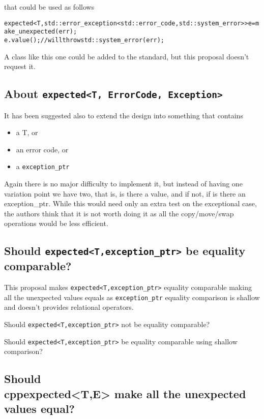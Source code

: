 \documentclass[a4paper,10pt]{article}
\newcommand{\cpp}[1]{\lstinline{#1}}
\begin{document}
\noindent
that could be used as follows

\begin{alltt}
expected<T, std::error_exception<std::error_code, std::system_error>> e = make_unexpected(err);
e.value(); // will throw std::system_error(err);
\end{alltt}

A class like this one could be added to the standard, but this proposal doesn't request it. 

\subsection{About \cpp{expected<T, ErrorCode, Exception>}}

It has been suggested also to extend the design into something that contains 

\begin{itemize}
\item a T, or
\item an error code, or
\item a \cpp{exception_ptr} 
\end{itemize}

Again there is no major difficulty to implement it, but instead of having one variation point we have two, that is, is there a value, and if not, if is there an exception_ptr. While this would need only an extra test on the exceptional case, the authors think that it is not worth doing it as all the copy/move/swap operations would be less efficient. 

\subsection{Should \cpp{expected<T,exception_ptr>} be equality comparable?}

This proposal makes \cpp{expected<T,exception_ptr>} equality comparable making all the unexpected values equals as \cpp{exception_ptr} equality comparison is shallow and doesn't provides relational operators.

Should \cpp{expected<T,exception_ptr>} not be equality comparable?

Should \cpp{expected<T,exception_ptr>} be equality comparable using shallow comparison?

\subsection{Should \\cpp{expected<T,E>} make all the unexpected values equal?}
\end{document}
